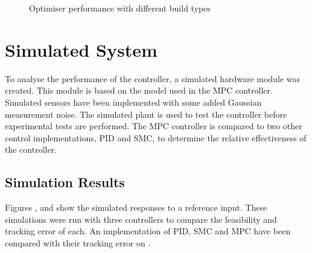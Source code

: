 \documentclass[11pt,a4paper]{article}
\begin{document}
\begin{figure}[hbt!]
    \centering
    \caption{Optimiser performance with different build types}
    \label{fig:optimiser_process_time}
\end{figure}


\clearpage
\section{Simulated System}
\label{sub:simulated_system}
To analyse the performance of the controller, a simulated hardware module was created. This module is based on the \cite{hosovsky_2012} model used in the MPC controller. Simulated sensors have been implemented with some added Gaussian measurement noise. The simulated plant is used to test the controller before experimental tests are performed. The MPC controller is compared to two other control implementations, PID and SMC, to determine the relative effectiveness of the controller.

\subsection{Simulation Results}
\label{sub:simulation_results}
Figures ,  and  show the simulated responses to a reference input. These simulations were run with three controllers to compare the feasibility and tracking error of each. An implementation of PID, SMC and MPC have been compared with their tracking error on .
\end{document}
